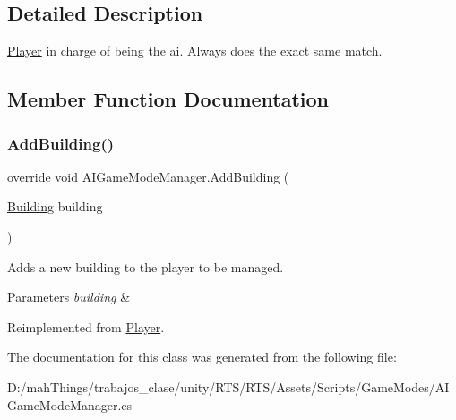 \subsection{Detailed Description}
\mbox{\hyperlink{class_player}{Player}} in charge of being the ai. Always does the exact same match. 



\subsection{Member Function Documentation}
\mbox{\label{class_a_i_game_mode_manager_a03f995c5332cfcab0f74740034316e99}} 
\subsubsection{\texorpdfstring{Add\+Building()}{AddBuilding()}}
{\footnotesize\ttfamily override void A\+I\+Game\+Mode\+Manager.\+Add\+Building (\begin{DoxyParamCaption}\item[{\mbox{\hyperlink{class_building}{Building}}}]{building }\end{DoxyParamCaption})\hspace{0.3cm}{\ttfamily [virtual]}}



Adds a new building to the player to be managed. 


\begin{DoxyParams}{Parameters}
{\em building} & \\
\hline
\end{DoxyParams}


Reimplemented from \mbox{\hyperlink{class_player}{Player}}.



The documentation for this class was generated from the following file\+:\begin{DoxyCompactItemize}
\item 
D\+:/mah\+Things/trabajos\+\_\+clase/unity/\+R\+T\+S/\+R\+T\+S/\+Assets/\+Scripts/\+Game\+Modes/A\+I\+Game\+Mode\+Manager.\+cs\end{DoxyCompactItemize}
